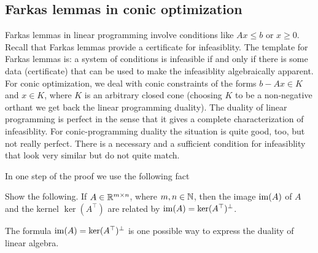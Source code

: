 \subsection{Farkas lemmas in conic optimization}


Farkas lemmas in linear programming involve conditions like $A x \le b$ or $x \ge 0$. Recall that Farkas lemmas provide a certificate for infeasiblity. The template for Farkas lemmas is: a system of conditions is infeasible if and only if there is some data (certificate) that can be used to make the infeasiblity algebraically apparent. For conic optimization, we deal with conic constraints of the forms $b - A x \in K$ and $x \in K$, where $K$ is an arbitrary closed cone (choosing $K$ to be a non-negative orthant we get back the linear programming duality). The duality of linear programming is perfect in the sense that it gives a complete characterization of infeasiblity. For conic-programming duality the situation is quite good, too, but not really perfect. There is a necessary and a sufficient condition for infeasiblity that look very similar but do not quite match. 

In one step of the proof we use the following fact

\begin{exercise}
	Show the following. If $A \in \mathbb{R}^{m \times n}$, where $m,n \in \mathbb{N}$, then the image $\operatorname{im}(A)$ of $A$ and the kernel $\ker(A^\top)$ are related by $\operatorname{im}(A) = \ker(A^\top)^\perp$. 
\end{exercise}

The formula $\operatorname{im}(A) = \ker(A^\top)^\perp$ is one possible way to express the duality of linear algebra. 
 

